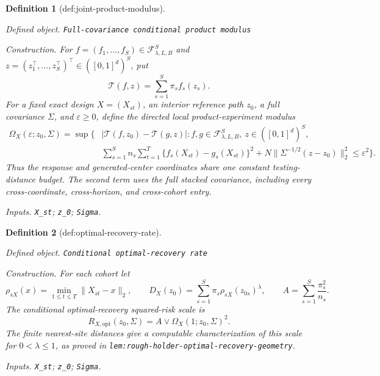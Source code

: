 \documentclass{article}
\newtheorem{definition}{Definition}
\begin{document}
\begin{definition}[def:joint-product-modulus]\label{def:joint-product-modulus}
\par\smallskip\noindent\emph{Defined object.} \texttt{Full-\allowbreak{}covariance conditional product modulus}
\par\smallskip\noindent\emph{Construction.} For \(f=(f_1,\ldots,f_S)\in\mathcal F_{\lambda,L,B}^{S}\) and
\(z=(z_1^\top,\ldots,z_S^\top)^\top\in([0,1]^d)^S\), put
\[
 \mathcal T(f,z)=\sum_{s=1}^{S}\pi_s f_s(z_s).
\]
For a fixed exact design \(X=(X_{st})\), an interior reference path
\(z_0\), a full covariance \(\Sigma\), and \(\varepsilon\ge0\), define the
directed local product-experiment modulus
\[
\begin{split}
 \Omega_X(\varepsilon;z_0,\Sigma)
 =\sup\bigg\{&|\mathcal T(f,z_0)-\mathcal T(g,z)|:
 f,g\in\mathcal F_{\lambda,L,B}^{S},\ z\in([0,1]^d)^S,\\
 &\sum_{s=1}^{S}n_s\sum_{t=1}^{T}
       \{f_s(X_{st})-g_s(X_{st})\}^2
   +N\|\Sigma^{-1/2}(z-z_0)\|_2^2\le\varepsilon^2
 \bigg\}.
\end{split}
\]
Thus the response and generated-center coordinates share one constant
testing-distance budget.  The second term uses the full stacked covariance,
including every cross-coordinate, cross-horizon, and cross-cohort entry.
\par\smallskip\noindent\emph{Inputs.} \texttt{X\_\allowbreak{}st}; \texttt{z\_\allowbreak{}0}; \texttt{Sigma}.
\end{definition}

\begin{definition}[def:optimal-recovery-rate]\label{def:optimal-recovery-rate}
\par\smallskip\noindent\emph{Defined object.} \texttt{Conditional optimal-\allowbreak{}recovery rate}
\par\smallskip\noindent\emph{Construction.} For each cohort let
\[
 \rho_{sX}(x)=\min_{1\le t\le T}\|X_{st}-x\|_2,
 \qquad
 D_X(z_0)=\sum_{s=1}^{S}\pi_s\rho_{sX}(z_{0s})^\lambda,
 \qquad
 A=\sum_{s=1}^{S}\frac{\pi_s^2}{n_s}.
\]
The conditional optimal-recovery squared-risk scale is
\[
 R_{X,\mathrm{opt}}(z_0,\Sigma)
 =A\vee\Omega_X(1;z_0,\Sigma)^2.
\]
The finite nearest-site distances give a computable characterization of this
scale for \(0<\lambda\le1\), as proved in
\texttt{lem:rough-holder-optimal-recovery-geometry}.
\par\smallskip\noindent\emph{Inputs.} \texttt{X\_\allowbreak{}st}; \texttt{z\_\allowbreak{}0}; \texttt{Sigma}.
\end{definition}
\end{document}
